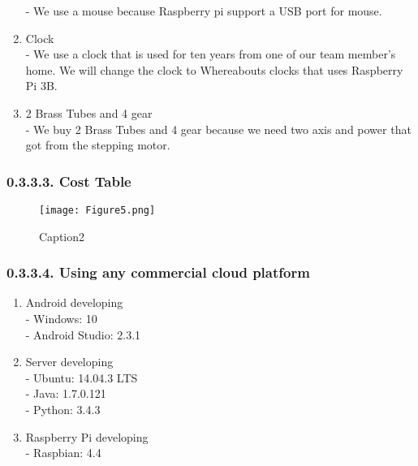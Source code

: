 \documentclass[10pt,a4paper,twocolumn]{report}
\begin{document}
\begin{enumerate}
			- We use a mouse because Raspberry pi support a USB port for mouse. \\
			\item Clock \\
			- We use a clock that is used for ten years from one of our team member’s home. We will change the clock to Whereabouts clocks that uses Raspberry Pi 3B. \\
			\item 2 Brass Tubes and 4 gear \\
			- We buy 2 Brass Tubes and 4 gear because we need two axis and power that got from the stepping motor.\\
		\end{enumerate}
		\subsubsection{0.3.3.3. Cost Table}
	 	    \begin{figure}[h]
			\centering
			\texttt{[image: Figure5.png]}
			\caption{Caption2}
			\label{fig2}
			\end{figure} 
		\subsubsection{0.3.3.4. Using any commercial cloud platform}
			\begin{enumerate}
			\item Android developing \\
			- Windows: 10 \\
			- Android Studio: 2.3.1 \\
			\item Server developing \\
			- Ubuntu: 14.04.3 LTS \\
			- Java: 1.7.0.121 \\
			- Python: 3.4.3 \\
			\item Raspberry Pi developing \\
			- Raspbian: 4.4 \\
			\end{enumerate} 
\end{document}
